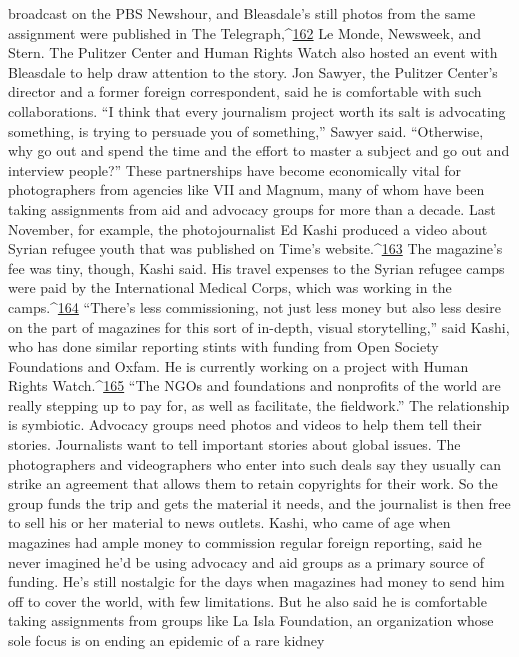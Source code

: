 broadcast on the PBS Newshour, and Bleasdale’s still photos from the same assignment
were published in The Telegraph,^{\href{#endnotes}{162}} Le Monde, Newsweek, and Stern.
The Pulitzer Center and Human Rights Watch also hosted an event with Bleasdale to help
draw attention to the story. Jon Sawyer, the Pulitzer Center’s director and a former
foreign correspondent, said he is comfortable with such collaborations. ``I think that every
journalism project worth its salt is advocating something, is trying to persuade you of
something,'' Sawyer said. ``Otherwise, why go out and spend the time and the effort to
master a subject and go out and interview people?''
These partnerships have become economically vital for photographers from agencies like
VII and Magnum, many of whom have been taking assignments from aid and advocacy
groups for more than a decade. Last November, for example, the photojournalist Ed
Kashi produced a video about Syrian refugee youth that was published on Time’s
website.^{\href{#endnotes}{163}} The magazine’s fee was tiny, though, Kashi said. His travel expenses to the
Syrian refugee camps were paid by the International Medical Corps, which was working
in the camps.^{\href{#endnotes}{164}} ``There’s less commissioning, not just less money but also less desire on
the part of magazines for this sort of in-depth, visual storytelling,'' said Kashi, who has
done similar reporting stints with funding from Open Society Foundations and Oxfam.
He is currently working on a project with Human Rights Watch.^{\href{#endnotes}{165}} ``The NGOs and
foundations and nonprofits of the world are really stepping up to pay for, as well as
facilitate, the fieldwork.''
The relationship is symbiotic. Advocacy groups need photos and videos to help them tell
their stories. Journalists want to tell important stories about global issues. The
photographers and videographers who enter into such deals say they usually can strike an
agreement that allows them to retain copyrights for their work. So the group funds the
trip and gets the material it needs, and the journalist is then free to sell his or her material
to news outlets.
Kashi, who came of age when magazines had ample money to commission regular
foreign reporting, said he never imagined he’d be using advocacy and aid groups as a
primary source of funding. He’s still nostalgic for the days when magazines had money
to send him off to cover the world, with few limitations.
But he also said he is comfortable taking assignments from groups like La Isla
Foundation, an organization whose sole focus is on ending an epidemic of a rare kidney
